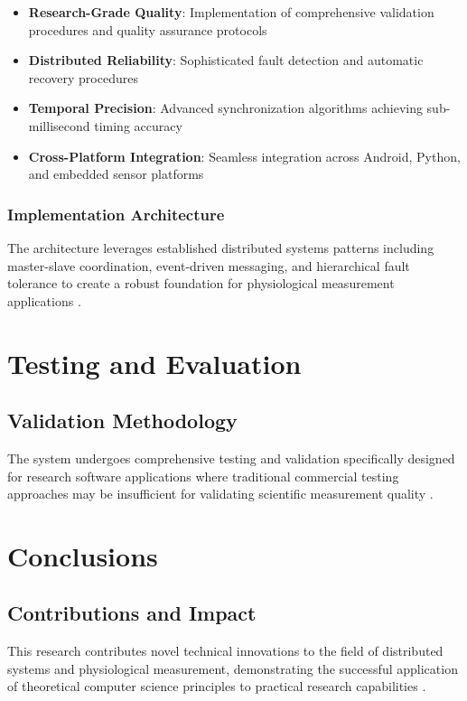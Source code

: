 \documentclass[11pt,a4paper]{report}
\begin{document}
\begin{itemize}
\item \textbf{Research-Grade Quality}: Implementation of comprehensive validation procedures and quality assurance protocols \cite{McConnell2004}
\item \textbf{Distributed Reliability}: Sophisticated fault detection and automatic recovery procedures \cite{Fischer1985}
\item \textbf{Temporal Precision}: Advanced synchronization algorithms achieving sub-millisecond timing accuracy \cite{Lamport2001}
\item \textbf{Cross-Platform Integration}: Seamless integration across Android, Python, and embedded sensor platforms \cite{Bass2012}
\end{itemize}

\subsection{Implementation Architecture}

The architecture leverages established distributed systems patterns including master-slave coordination, event-driven
messaging, and hierarchical fault tolerance to create a robust foundation for physiological measurement applications \cite{Chandra1996}.

\chapter{Testing and Evaluation}

\section{Validation Methodology}

The system undergoes comprehensive testing and validation specifically designed for research software applications where
traditional commercial testing approaches may be insufficient for validating scientific measurement quality \cite{Parnas1972}.

\chapter{Conclusions}

\section{Contributions and Impact}

This research contributes novel technical innovations to the field of distributed systems and physiological measurement,
demonstrating the successful application of theoretical computer science principles to practical research capabilities \cite{Brooks1995}.



\end{document}
